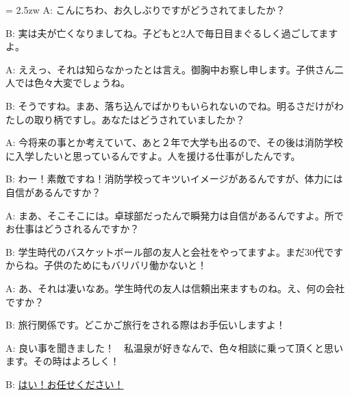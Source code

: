 \documentclass[11pt]{amsart}
\title{}
\author{}
\newenvironment{hangall}[1]{\hangindent = 2.5zw\everypar{\hangindent = 2.5zw}}{}
\begin{document}
\maketitle
\begin{hangall}{}%
A: こんにちわ、お久しぶりですがどうされてましたか？

B: 実は夫が亡くなりましてね。子どもと2人で毎日目まぐるしく過ごしてますよ。

A: ええっ、それは知らなかったとは言え。御胸中お察し申します。子供さん二人では色々大変でしょうね。

B: そうですね。まあ、落ち込んでばかりもいられないのでね。明るさだけがわたしの取り柄ですし。あなたはどうされていましたか？

A: 今将来の事とか考えていて、あと２年で大学も出るので、その後は消防学校に入学したいと思っているんですよ。人を援ける仕事がしたんです。

B: わー！素敵ですね！消防学校ってキツいイメージがあるんですが、体力には自信があるんですか？

A: まあ、そこそこには。卓球部だったんで瞬発力は自信があるんですよ。所でお仕事はどうされるんですか？

B: 学生時代のバスケットボール部の友人と会社をやってますよ。まだ30代ですからね。子供のためにもバリバリ働かないと！

A: あ、それは凄いなあ。学生時代の友人は信頼出来ますものね。え、何の会社ですか？

B: 旅行関係です。どこかご旅行をされる際はお手伝いしますよ！

A: 良い事を聞きました！　私温泉が好きなんで、色々相談に乗って頂くと思います。その時はよろしく！

B: \ul{はい！お任せください！}\end{hangall}
\end{document}
